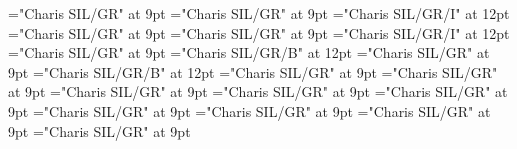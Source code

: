 \documentclass[gps1,twoside]{article}
\begin{document}
\font\spanspanlexsensereferencessensesensessensesensessubentrysubentriesentrybefore="Charis SIL/GR" at 9pt
\font\lexsensereferencessensesensessensesensessubentrysubentriesentryafter="Charis SIL/GR" at 9pt
\font\spanenownertypeabbreviationlexsensereferencelexsensereferencessensesensessensesensessubentrysubentriesentry="Charis SIL/GR/I" at 12pt
\font\spanspanownertypeabbreviationlexsensereferencelexsensereferencessensesensessensesensessubentrysubentriesentrybefore="Charis SIL/GR" at 9pt
\font\spanownertypeabbreviationlexsensereferencelexsensereferencessensesensessensesensessubentrysubentriesentrylastchildafter="Charis SIL/GR" at 9pt
\font\spanownertypeabbreviationlexsensereferencelexsensereferencessensesensessensesensessubentrysubentriesentry="Charis SIL/GR/I" at 12pt
\font\configtargetconfigtargetconfigtargetslexsensereferencelexsensereferencessensesensessensesensessubentrysubentriesentrybefore="Charis SIL/GR" at 9pt
\font\spanbzhheadwordconfigtargetconfigtargetslexsensereferencelexsensereferencessensesensessensesensessubentrysubentriesentry="Charis SIL/GR/B" at 12pt
\font\spanspanheadwordconfigtargetconfigtargetslexsensereferencelexsensereferencessensesensessensesensessubentrysubentriesentrybefore="Charis SIL/GR" at 9pt
\font\spanheadwordconfigtargetconfigtargetslexsensereferencelexsensereferencessensesensessensesensessubentrysubentriesentry="Charis SIL/GR/B" at 12pt
\font\variantformentrybackrefvariantformentrybackrefvariantformentrybackrefssensesensessensesensessubentrysubentriesentrybefore="Charis SIL/GR" at 9pt
\font\variantformentrybackrefssensesensessensesensessubentrysubentriesentrybefore="Charis SIL/GR" at 9pt
\font\variantformentrybackrefssensesensessensesensessubentrysubentriesentryafter="Charis SIL/GR" at 9pt
\font\variantentrytypevariantentrytypevariantentrytypesvariantformentrybackrefvariantformentrybackrefssensesensessensesensessubentrysubentriesentrybefore="Charis SIL/GR" at 9pt
\font\variantentrytypesvariantformentrybackrefvariantformentrybackrefssensesensessensesensessubentrysubentriesentryafter="Charis SIL/GR" at 9pt
\font\spanspanreverseabbrvariantentrytypevariantentrytypesvariantformentrybackrefvariantformentrybackrefssensesensessensesensessubentrysubentriesentrybefore="Charis SIL/GR" at 9pt
\font\spanreverseabbrvariantentrytypevariantentrytypesvariantformentrybackrefvariantformentrybackrefssensesensessensesensessubentrysubentriesentrylastchildafter="Charis SIL/GR" at 9pt
\font\spanspanheadwordvariantformentrybackrefvariantformentrybackrefssensesensessensesensessubentrysubentriesentrybefore="Charis SIL/GR" at 9pt
\font\spanspanowningentrysummarydefinitionvariantformentrybackrefvariantformentrybackrefssensesensessensesensessubentrysubentriesentrybefore="Charis SIL/GR" at 9pt
\end{document}
